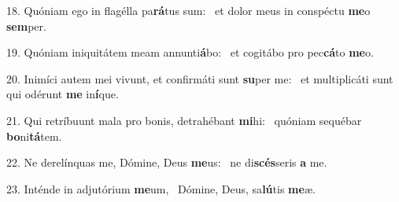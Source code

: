 18. Quóniam ego in flagélla pa\textbf{rá}tus sum: \ast\  et dolor meus in conspéctu \textbf{me}o \textbf{sem}per.\

19. Quóniam iniquitátem meam annunti\textbf{á}bo: \ast\  et cogitábo pro pec\textbf{cá}to \textbf{me}o.\

20. Inimíci autem mei vivunt, et confirmáti sunt \textbf{su}per me: \ast\  et multiplicáti sunt qui odérunt \textbf{me} in\textbf{í}que.\

21. Qui retríbuunt mala pro bonis, detrahébant \textbf{mi}hi: \ast\  quóniam sequébar \textbf{bo}ni\textbf{tá}tem.\

22. Ne derelínquas me, Dómine, Deus \textbf{me}us: \ast\  ne di\textbf{scés}seris \textbf{a} me.\

23. Inténde in adjutórium \textbf{me}um, \ast\  Dómine, Deus, sa\textbf{lú}tis \textbf{me}æ.\

